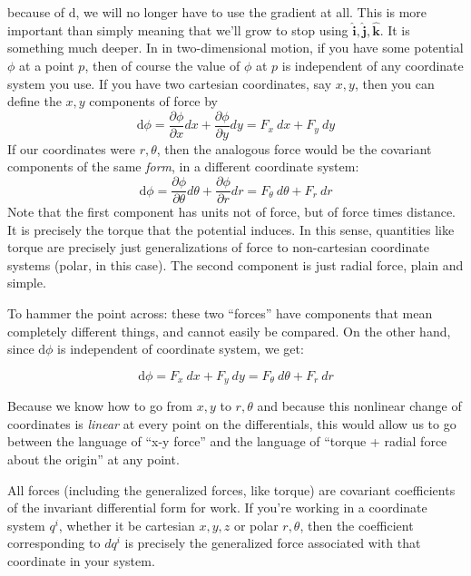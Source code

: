 \documentclass[../master.tex]{subfiles}
\begin{document}
	because of $\mathrm d$, we will no longer have to use the gradient at all. This is more important than simply meaning that we'll grow to stop using $\mathbf{\hat i}, \mathbf{\hat j},\mathbf{\hat k}$. It is something much deeper. In in two-dimensional motion, if you have some potential $\phi$ at a point $p$, then of course the value of $\phi$ at $p$ is independent of any coordinate system you use. If you have two cartesian coordinates, say $x,y$, then you can define the $x,y$ components of force by 
	\begin{equation*}
		\mathrm d \phi= \frac{\partial \phi}{\partial x} dx + \frac{\partial \phi}{\partial y} dy= F_x ~ dx + F_y ~dy 
	\end{equation*}
	If our coordinates were $r,\theta$, then the analogous force would be the covariant components of the same \emph{form}, in a different coordinate system:
	\begin{equation*}
		\mathrm d \phi = \frac{\partial \phi}{\partial \theta} d\theta + \frac{\partial \phi}{\partial r} dr = F_\theta ~ d\theta + F_r ~ dr
	\end{equation*}
	Note that the first component has units not of force, but of force times distance. It is precisely the torque that the potential induces. In this sense, quantities like torque are precisely just generalizations of force to non-cartesian coordinate systems (polar, in this case). The second component is just radial force, plain and simple.
	
	To hammer the point across: these two ``forces'' have components that mean completely different things, and cannot easily be compared. On the other hand, since $\mathrm d \phi$ is independent of coordinate system, we get:
	
	\begin{equation}
		\mathrm d \phi = F_x ~ dx + F_y ~ dy = F_\theta ~ d\theta + F_r ~ dr 
	\end{equation}
	
	Because we know how to go from $x,y$ to $r, \theta$ and because this nonlinear change of coordinates is \emph{linear} at every point on the differentials, this would allow us to go between the language of ``x-y force'' and the language of ``torque + radial force about the origin''  at any point.
	
	All forces (including the generalized forces, like torque) are covariant coefficients of the invariant differential form for work. If you're working in a coordinate system $q^i$, whether it be cartesian $x,y,z$ or polar $r, \theta$, then the coefficient corresponding to $dq^i$ is precisely the generalized force associated with that coordinate in your system.\\
	
\end{document}
